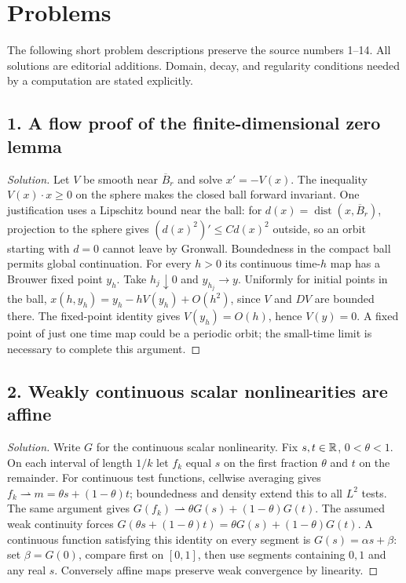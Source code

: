 \section{Problems}
\label{sec:9-7}
The following short problem descriptions preserve the source numbers 1--14.
All solutions are editorial additions. Domain, decay, and regularity conditions
needed by a computation are stated explicitly.

\subsection*{1. A flow proof of the finite-dimensional zero lemma}
\begin{proof}[Solution]
Let $V$ be smooth near $\overline B_r$ and solve $x'=-V(x)$.
The inequality $V(x)\cdot x\geq0$ on the sphere makes the closed ball
forward invariant. One justification uses a Lipschitz bound near the ball:
for $d(x)=\operatorname{dist}(x,\overline B_r)$, projection to the sphere
gives $(d(x)^2)'\leq C d(x)^2$ outside, so an orbit starting with $d=0$
cannot leave by Gronwall. Boundedness in the compact ball permits global
continuation. For every $h>0$ its continuous time-$h$ map has a Brouwer
fixed point $y_h$. Take $h_j\downarrow0$ and $y_{h_j}\to y$.
Uniformly for initial points in the ball,
$x(h,y_h)=y_h-hV(y_h)+O(h^2)$, since $V$ and $DV$ are bounded there.
The fixed-point identity gives $V(y_h)=O(h)$, hence $V(y)=0$.
A fixed point of just one time map could be a periodic orbit; the
small-time limit is necessary to complete this argument.
\end{proof}

\subsection*{2. Weakly continuous scalar nonlinearities are affine}
\begin{proof}[Solution]
Write $G$ for the continuous scalar nonlinearity. Fix $s,t\in\mathbb{R}$,
$0<\theta<1$. On each interval of length $1/k$ let $f_k$ equal $s$ on
the first fraction $\theta$ and $t$ on the remainder.
For continuous test functions, cellwise averaging gives
$f_k\rightharpoonup m=\theta s+(1-\theta)t$; boundedness and density
extend this to all $L^2$ tests. The same argument gives
$G(f_k)\rightharpoonup\theta G(s)+(1-\theta)G(t)$. The assumed weak
continuity forces
$G(\theta s+(1-\theta)t)=\theta G(s)+(1-\theta)G(t)$.
A continuous function satisfying this identity on every segment is
$G(s)=\alpha s+\beta$: set $\beta=G(0)$, compare first on $[0,1]$,
then use segments containing $0,1$ and any real $s$. Conversely affine
maps preserve weak convergence by linearity.
\end{proof}

